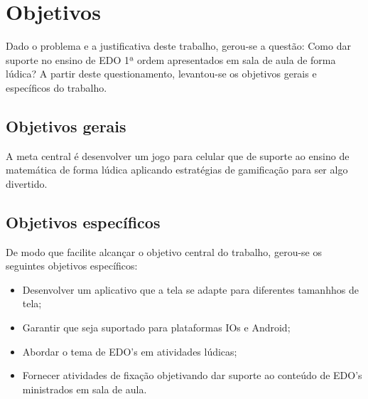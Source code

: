 \chapter[Objetivos]{Objetivos}
Dado o problema e a justificativa deste trabalho, gerou-se a questão: Como dar suporte no ensino de EDO 1ª ordem apresentados em sala de aula de forma lúdica? A partir deste questionamento, levantou-se os objetivos gerais e específicos do trabalho.

\section[Objetivos gerais]{Objetivos gerais}
A meta central é desenvolver um jogo para celular que de suporte ao ensino de matemática de forma lúdica aplicando estratégias de gamificação para ser algo divertido. 

\section[Objetivos específicos]{Objetivos específicos}

De modo que facilite alcançar o objetivo central do trabalho, gerou-se os seguintes objetivos específicos:
\begin{itemize}[]

\item Desenvolver um aplicativo que a tela se adapte para diferentes tamanhhos de tela;
\item Garantir que seja suportado para plataformas IOs e Android;
\item Abordar o tema de EDO's em atividades lúdicas;
\item Fornecer atividades de fixação objetivando dar suporte ao conteúdo de EDO's ministrados em sala de aula.

\end{itemize}
